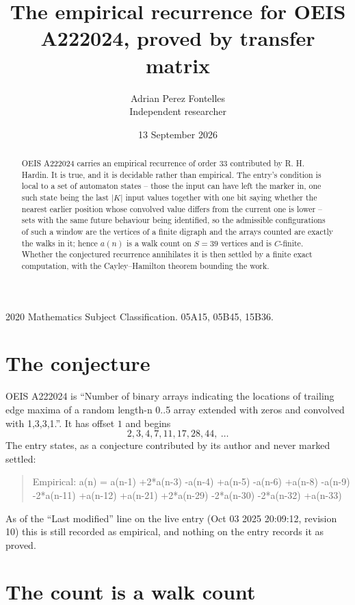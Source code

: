 \documentclass[11pt,a4paper]{article}
\title{The empirical recurrence for OEIS A222024, proved by transfer matrix}
\author{Adrian Perez Fontelles\\ \small Independent researcher}
\date{13 September 2026}
\theoremstyle{plain}
\theoremstyle{definition}
\begin{document}
\maketitle

\begin{abstract}
OEIS A222024 carries an empirical recurrence of order $33$ contributed by R. H. Hardin. It is
true, and it is decidable rather than empirical. The entry's condition is local to a set of automaton states -- those the input can have left the marker in, one such state being the last $|K|$ input values together with one bit saying whether the nearest earlier position whose convolved value differs from the current one is lower -- sets with the same future behaviour being identified, so
the admissible configurations of such a window are the vertices of a finite digraph and the
arrays counted are exactly the walks in it; hence $a(n)$ is a walk count on $S=39$ vertices
and is $C$-finite. Whether the conjectured recurrence annihilates it is then settled by a
finite exact computation, with the Cayley--Hamilton theorem bounding the work.
\end{abstract}

\noindent\small 2020 Mathematics Subject Classification. 05A15, 05B45, 15B36.\normalsize

\section{The conjecture}

OEIS A222024 is ``Number of binary arrays indicating the locations of trailing edge maxima of a random length-n 0..5 array extended with zeros and convolved with 1,3,3,1.''. It has offset $1$ and begins
\[
2, 3, 4, 7, 11, 17, 28, 44,\ \dots
\]
The entry states, as a conjecture contributed by its author and never marked settled:
\begin{quote}
Empirical: a(n) = a(n-1) +2*a(n-3) -a(n-4) +a(n-5) -a(n-6) +a(n-8) -a(n-9) -2*a(n-11) +a(n-12) +a(n-21) +2*a(n-29) -2*a(n-30) -2*a(n-32) +a(n-33)
\end{quote}
As of the ``Last modified'' line on the live entry (Oct 03 2025 20:09:12, revision 10) this is still
recorded as empirical, and nothing on the entry records it as proved.

\section{The count is a walk count}
\end{document}
